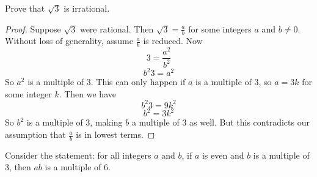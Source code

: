 \begin{questions}
 \question Prove that $\sqrt 3$ is irrational.

   \begin{answer}
     \begin{proof}
      Suppose $\sqrt{3}$ were rational.  Then $\sqrt{3} = \frac{a}{b}$ for some integers $a$ and $b \ne 0$.  Without loss of generality, assume $\frac{a}{b}$ is reduced.  Now
 \[3 = \frac{a^2}{b^2}\]
 \[b^2 3 = a^2\]
 So $a^2$ is a multiple of 3.  This can only happen if $a$ is a multiple of 3, so $a = 3k$ for some integer $k$.  Then we have
 \[b^2 3 = 9k^2\]
 \[b^2 = 3k^2\]
 So $b^2$ is a multiple of 3, making $b$ a multiple of 3 as well.  But this contradicts our assumption that $\frac{a}{b}$ is in lowest terms.
     \end{proof}
   \end{answer}





 \question Consider the statement: for all integers $a$ and $b$, if $a$ is even and $b$ is a multiple of 3, then $ab$ is a multiple of 6.

	\begin{answer}
	\end{answer}





\end{questions}
